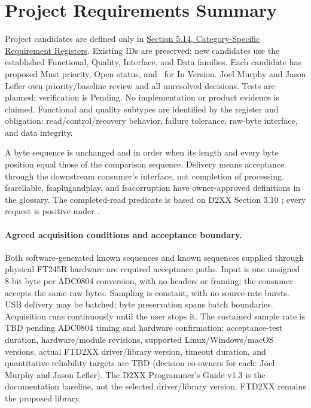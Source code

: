 \begingroup
\setlength{\emergencystretch}{2em}
\section{Project Requirements Summary}
\label{Section:ProjectRequirementsSummary}
Project candidates are defined only in
\hyperref[Section:ProjectRequirements]{Section 5.14, Category-Specific Requirement Registers}.
Existing IDs are preserved; new candidates use the established Functional,
Quality, Interface, and Data families. Each candidate has proposed Must
priority, Open status, and \NoVersion\ for In Version. Joel Murphy and Jason Lefler own
priority/baseline review and all unresolved decisions. Tests are planned;
verification is  Pending. No implementation or product evidence
is claimed. Functional and quality subtypes are identified by the register
and obligation: read/control/recovery behavior, failure tolerance, raw-byte
interface, and data integrity.

A byte sequence is unchanged and in order when its length and every byte
position equal those of the comparison sequence. Delivery means acceptance
through the downstream consumer's interface, not completion of processing.
\Gls{fsareliable}, \gls{fsaplugandplay}, and \gls{fsacorruption} have
owner-approved definitions in the glossary. The completed-read predicate is
based on D2XX Section 3.10 \cite{FTDI_D2XX_v1_3}; every request is positive
under .

\paragraph{Agreed acquisition conditions and acceptance boundary.}
\label{Section:ProjectAcquisitionConditions}
Both software-generated known sequences and known sequences supplied through
physical FT245R hardware are required acceptance paths. Input is one unsigned
8-bit byte per ADC0804 conversion, with no headers or framing; the consumer
accepts the same raw bytes. Sampling is constant, with no source-rate bursts.
USB delivery may be batched; byte preservation spans batch boundaries.
Acquisition runs continuously until the user stops it. The sustained sample
rate is TBD pending ADC0804 timing and hardware confirmation; acceptance-test
duration, hardware/module revisions, supported Linux/Windows/macOS versions,
actual FTD2XX driver/library version, timeout duration, and quantitative
reliability targets are TBD (decision co-owners for each: Joel Murphy and Jason Lefler).
The D2XX Programmer's Guide v1.3 is the documentation baseline, not the
selected driver/library version. FTD2XX remains the proposed library.


